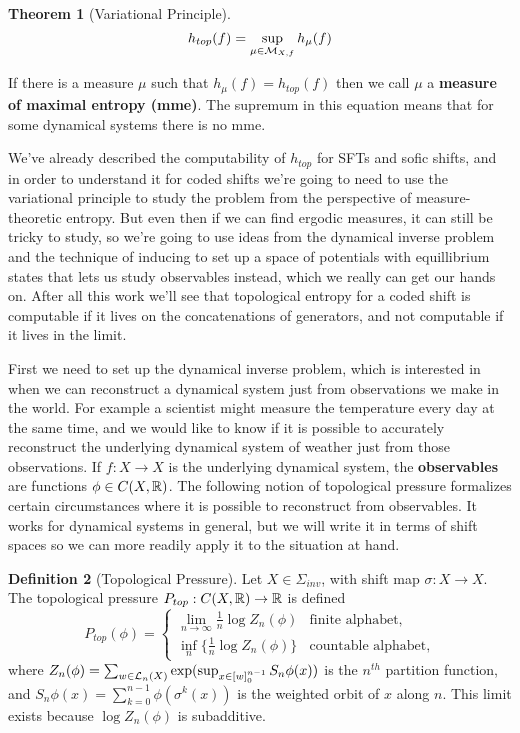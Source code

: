 \documentclass[11pt, reqno]{amsart}
\theoremstyle{plain}
\newtheorem{thm}{Theorem}[section]
\numberwithin{thm}{subsection}
\theoremstyle{definition}
\newtheorem{defn}[thm]{Definition}
\begin{document}
\begin{thm}[Variational Principle]
  $$h_{top}(f)= \sup_{\mu \in \mathcal{M}_{X,f}}h_\mu(f)$$
\end{thm}

If there is a measure $\mu$ such that $h_\mu(f) = h_{top}(f)$ then we call $\mu$ a \textbf{measure of maximal entropy (mme)}. The supremum in this equation means that for some dynamical systems there is no mme. 

We've already described the computability of $h_{top}$ for SFTs and sofic shifts, and in order to understand it for coded shifts we're going to need to use the variational principle to study the problem from the perspective of measure-theoretic entropy. But even then if we can find ergodic measures, it can still be tricky to study, so we're going to use ideas from the dynamical inverse problem and the technique of inducing to set up a space of potentials with equillibrium states that lets us study observables instead, which we really can get our hands on. After all this work we'll see that topological entropy for a coded shift is computable if it lives on the concatenations of generators, and not computable if it lives in the limit.

First we need to set up the dynamical inverse problem, which is interested in when we can reconstruct a dynamical system just from observations we make in the world. For example a scientist might measure the temperature every day at the same time, and we would like to know if it is possible to accurately reconstruct the underlying dynamical system of weather just from those observations. If $f: X \rightarrow X$ is the underlying dynamical system, the \textbf{observables} are functions $\phi \in C(X,\mathbb{R})$. The following notion of topological pressure formalizes certain circumstances where it is possible to reconstruct from observables. It works for dynamical systems in general, but we will write it in terms of shift spaces so we can more readily apply it to the situation at hand.
\begin{defn}[Topological Pressure]
  Let $X \in \Sigma_{inv}$, with shift map $\sigma: X \rightarrow X$. The topological pressure $P_{top}: C(X,\mathbb{R}) \rightarrow \mathbb{R}$ is defined 
  $$P_{top}(\phi) = \begin{cases}
    \lim_{n\rightarrow \infty}\frac{1}{n}\log Z_n(\phi) & \text{finite alphabet,} \\ 
    \inf_n \{\frac{1}{n}\log Z_n(\phi)\}
    & \text{countable alphabet,}
  \end{cases}$$
  where $Z_n(\phi) = \sum_{w \in \mathcal{L}_n(X)}\exp(\sup_{x \in [w]_0^{n-1}} S_n\phi(x))$ is the $n^{th}$ partition function, and 
  $S_n\phi(x) = \sum_{k=0}^{n-1}\phi(\sigma^k(x))$ is the weighted orbit of $x$ along $n$. This limit exists because  $\log Z_n(\phi)$ is subadditive.
\end{defn}
\end{document}
